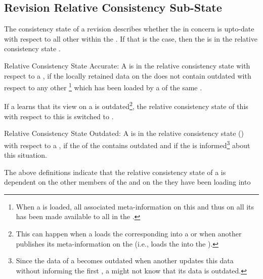 \documentclass[a4paper, 12pt]{book}
\begin{document}
\subsection{Revision Relative Consistency Sub-State}


The consistency state of a revision describes whether the
 in concern is upto-date with respect to all other
 within the . If that is
the case, then the  is in the relative consistency state
\revrelconstateACCURATE.
%
\begin{definition*}{Relative Consistency State Accurate: \revrelconstateACCURATE} 
  A  is in the relative consistency state 
  with respect to a , if the locally retained data on the
   does not contain outdated  with respect
  to any other
  \footnote{\label{fn:database-contains-metadata} When a
   is loaded, all associated meta-information on this
   and thus on all its  has been made
  available to all  in the .} which has
  been loaded by a  of the same .
\end{definition*}
%
If a  learns that its view on a  is
outdated\footnote{This can happen when a  loads the
corresponding  into a  or when another
 publishes its meta-information on the 
(i.e., loads the  into the ).}, the
relative consistency state of this  with respect to this
 is switched to \revrelconstateOUTDATED.
%
\begin{definition*}{Relative Consistency State Outdated: \revrelconstateOUTDATED} %
  A  is in the relative consistency state 
  (\revrelconstateOUTDATED) with respect to a , if the
   of the  contains outdated
   and if the  is
  informed\footnote{Since the data of a  becomes outdated
  when another  updates this data without informing the
  first , a  might not know that its data is
  outdated.} about this situation.
\end{definition*}
%
The above definitions indicate that the relative consistency state of
a  is dependent on the other members of the  and on the  they have been loading into
\end{document}
